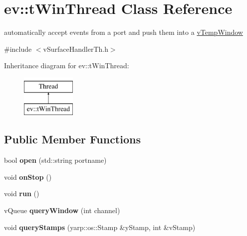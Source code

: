 \hypertarget{classev_1_1tWinThread}{}\section{ev\+:\+:t\+Win\+Thread Class Reference}
\label{classev_1_1tWinThread}


automatically accept events from a port and push them into a \hyperlink{classev_1_1vTempWindow}{v\+Temp\+Window}  




{\ttfamily \#include $<$v\+Surface\+Handler\+Th.\+h$>$}

Inheritance diagram for ev\+:\+:t\+Win\+Thread\+:\begin{figure}[H]
\begin{center}
\leavevmode
\includegraphics[height=2.000000cm]{classev_1_1tWinThread}
\end{center}
\end{figure}
\subsection*{Public Member Functions}
\begin{DoxyCompactItemize}
\item 
bool {\bfseries open} (std\+::string portname)\hypertarget{classev_1_1tWinThread_a38015410daeb0a64cf458a5d996192b3}{}\label{classev_1_1tWinThread_a38015410daeb0a64cf458a5d996192b3}

\item 
void {\bfseries on\+Stop} ()\hypertarget{classev_1_1tWinThread_ab12b04cd804ac7f6d2f6a199bb2078a8}{}\label{classev_1_1tWinThread_ab12b04cd804ac7f6d2f6a199bb2078a8}

\item 
void {\bfseries run} ()\hypertarget{classev_1_1tWinThread_a6992dcf7884d08d7296e4489ef264959}{}\label{classev_1_1tWinThread_a6992dcf7884d08d7296e4489ef264959}

\item 
v\+Queue {\bfseries query\+Window} (int channel)\hypertarget{classev_1_1tWinThread_a6937e3d587982b4ecbc8e776c89b5ea1}{}\label{classev_1_1tWinThread_a6937e3d587982b4ecbc8e776c89b5ea1}

\item 
void {\bfseries query\+Stamps} (yarp\+::os\+::\+Stamp \&y\+Stamp, int \&v\+Stamp)\hypertarget{classev_1_1tWinThread_a346e943bc1a1e06210deb6da26fa18f6}{}\label{classev_1_1tWinThread_a346e943bc1a1e06210deb6da26fa18f6}

\end{DoxyCompactItemize}


